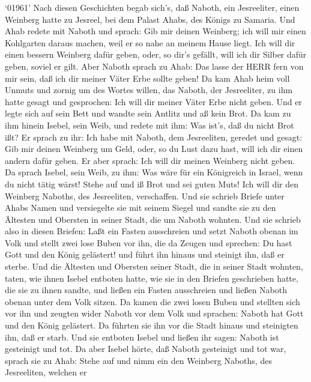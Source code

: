  `01961' Nach diesen Geschichten begab sich's, daß Naboth,
ein Jesreeliter, einen Weinberg hatte zu Jesreel, bei dem Palast Ahabs,
des Königs zu Samaria.  Und Ahab redete mit Naboth und
sprach: Gib mir deinen Weinberg; ich will mir einen Kohlgarten daraus
machen, weil er so nahe an meinem Hause liegt. Ich will dir einen
bessern Weinberg dafür geben, oder, so dir's gefällt, will ich dir
Silber dafür geben, soviel er gilt.  Aber Naboth sprach zu
Ahab: Das lasse der HERR fern von mir sein, daß ich dir meiner Väter
Erbe sollte geben!  Da kam Ahab heim voll Unmuts und zornig
um des Wortes willen, das Naboth, der Jesreeliter, zu ihm hatte gesagt
und gesprochen: Ich will dir meiner Väter Erbe nicht geben. Und er legte
sich auf sein Bett und wandte sein Antlitz und aß kein Brot.
 Da kam zu ihm hinein Isebel, sein Weib, und redete mit ihm:
Was ist's, daß du nicht Brot ißt?  Er sprach zu ihr: Ich
habe mit Naboth, dem Jesreeliten, geredet und gesagt: Gib mir deinen
Weinberg um Geld, oder, so du Lust dazu hast, will ich dir einen andern
dafür geben. Er aber sprach: Ich will dir meinen Weinberg nicht geben.
 Da sprach Isebel, sein Weib, zu ihm: Was wäre für ein
Königreich in Israel, wenn du nicht tätig wärst! Stehe auf und iß Brot
und sei guten Muts! Ich will dir den Weinberg Naboths, des Jesreeliten,
verschaffen.  Und sie schrieb Briefe unter Ahabs Namen und
versiegelte sie mit seinem Siegel und sandte sie zu den Ältesten und
Obersten in seiner Stadt, die um Naboth wohnten.  Und sie
schrieb also in diesen Briefen: Laßt ein Fasten ausschreien und setzt
Naboth obenan im Volk  und stellt zwei lose Buben vor ihn,
die da Zeugen und sprechen: Du hast Gott und den König gelästert! und
führt ihn hinaus und steinigt ihn, daß er sterbe.  Und die
Ältesten und Obersten seiner Stadt, die in seiner Stadt wohnten, taten,
wie ihnen Isebel entboten hatte, wie sie in den Briefen geschrieben
hatte, die sie zu ihnen sandte,  und ließen ein Fasten
ausschreien und ließen Naboth obenan unter dem Volk sitzen.
 Da kamen die zwei losen Buben und stellten sich vor ihn
und zeugten wider Naboth vor dem Volk und sprachen: Naboth hat Gott und
den König gelästert. Da führten sie ihn vor die Stadt hinaus und
steinigten ihn, daß er starb.  Und sie entboten Isebel und
ließen ihr sagen: Naboth ist gesteinigt und tot.  Da aber
Isebel hörte, daß Naboth gesteinigt und tot war, sprach sie zu Ahab:
Stehe auf und nimm ein den Weinberg Naboths, des Jesreeliten, welchen er
